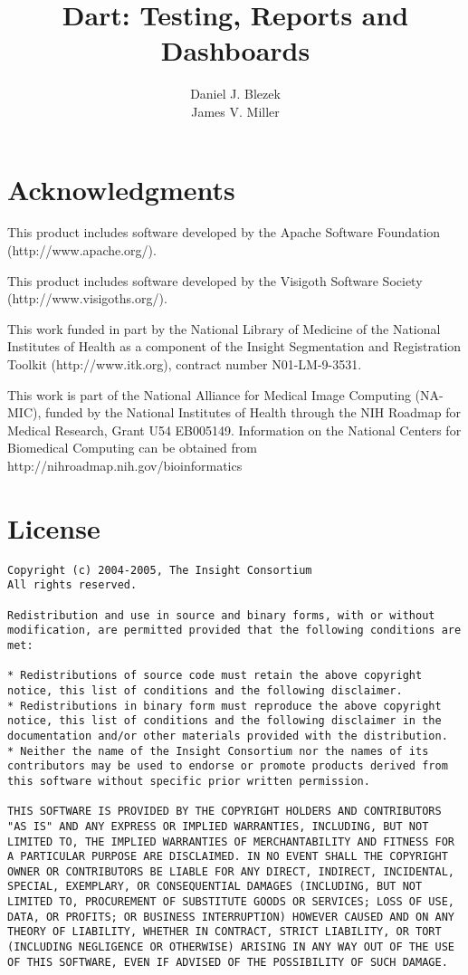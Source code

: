 \documentclass{InsightBook}
\begin{document}
\title{Dart: Testing, Reports and Dashboards}
\author{Daniel J. Blezek \\
James V. Miller}
\maketitle
\chapter*{Acknowledgments}
This product includes software developed by the Apache Software Foundation (http://www.apache.org/).

This product includes software developed by the Visigoth Software Society (http://www.visigoths.org/).

This work funded in part by the National Library of Medicine of the National Institutes of Health as a component of the Insight Segmentation and Registration Toolkit (http://www.itk.org), contract number N01-LM-9-3531.

This work is part of the National Alliance for Medical Image
Computing (NA-MIC), funded by the National Institutes of Health
through the NIH Roadmap for Medical Research, Grant U54 EB005149.
Information on the National Centers for Biomedical Computing
can be obtained from http://nihroadmap.nih.gov/bioinformatics

\chapter*{License}
\begin{verbatim}
Copyright (c) 2004-2005, The Insight Consortium
All rights reserved.

Redistribution and use in source and binary forms, with or without
modification, are permitted provided that the following conditions are
met:

* Redistributions of source code must retain the above copyright
notice, this list of conditions and the following disclaimer.
* Redistributions in binary form must reproduce the above copyright
notice, this list of conditions and the following disclaimer in the
documentation and/or other materials provided with the distribution.
* Neither the name of the Insight Consortium nor the names of its
contributors may be used to endorse or promote products derived from
this software without specific prior written permission.

THIS SOFTWARE IS PROVIDED BY THE COPYRIGHT HOLDERS AND CONTRIBUTORS
"AS IS" AND ANY EXPRESS OR IMPLIED WARRANTIES, INCLUDING, BUT NOT
LIMITED TO, THE IMPLIED WARRANTIES OF MERCHANTABILITY AND FITNESS FOR
A PARTICULAR PURPOSE ARE DISCLAIMED. IN NO EVENT SHALL THE COPYRIGHT
OWNER OR CONTRIBUTORS BE LIABLE FOR ANY DIRECT, INDIRECT, INCIDENTAL,
SPECIAL, EXEMPLARY, OR CONSEQUENTIAL DAMAGES (INCLUDING, BUT NOT
LIMITED TO, PROCUREMENT OF SUBSTITUTE GOODS OR SERVICES; LOSS OF USE,
DATA, OR PROFITS; OR BUSINESS INTERRUPTION) HOWEVER CAUSED AND ON ANY
THEORY OF LIABILITY, WHETHER IN CONTRACT, STRICT LIABILITY, OR TORT
(INCLUDING NEGLIGENCE OR OTHERWISE) ARISING IN ANY WAY OUT OF THE USE
OF THIS SOFTWARE, EVEN IF ADVISED OF THE POSSIBILITY OF SUCH DAMAGE.
\end{verbatim}
\end{document}
